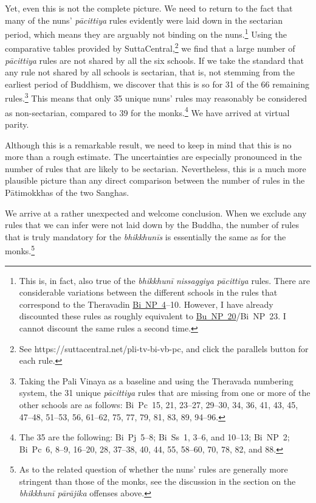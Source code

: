 \documentclass[12pt,openany]{book}%
\begin{document}
Yet, even this is not the complete picture. We need to return to the fact that many of the nuns’ \textit{\textsanskrit{pācittiya}} rules evidently were laid down in the sectarian period, which means they are arguably not binding on the nuns.\footnote{This is, in fact, also true of the \textit{\textsanskrit{bhikkhunī} nissaggiya \textsanskrit{pācittiya}} rules. There are considerable variations between the different schools in the rules that correspond to the Theravadin \href{https://suttacentral.net/pli-tv-bi-vb-np4/en/brahmali\#1.27.1}{Bi~NP~4}–10. However, I have already discounted these rules as roughly equivalent to \href{https://suttacentral.net/pli-tv-bu-vb-np20/en/brahmali\#1.35.1}{Bu~NP~20}/Bi NP 23. I cannot discount the same rules a second time. } Using the comparative tables provided by SuttaCentral,\footnote{See https://suttacentral.net/pli-tv-bi-vb-pc, and click the parallels button for each rule. } we find that a large number of \textit{\textsanskrit{pācittiya}} rules are not shared by all the six schools. If we take the standard that any rule not shared by all schools is sectarian, that is, not stemming from the earliest period of Buddhism, we discover that this is so for 31 of the 66 remaining rules.\footnote{Taking the Pali Vinaya as a baseline and using the Theravada numbering system, the 31 unique \textit{\textsanskrit{pācittiya}} rules that are missing from one or more of the other schools are as follows: Bi Pc 15, 21, 23–27, 29–30, 34, 36, 41, 43, 45, 47–48, 51–53, 56, 61–62, 75, 77, 79, 81, 83, 89, 94–96. } This means that only 35 unique nuns’ rules may reasonably be considered as non-sectarian, compared to 39 for the monks.\footnote{The 35 are the following: Bi Pj 5–8; Bi Ss 1, 3–6, and 10–13; Bi NP 2; Bi Pc 6, 8–9, 16–20, 28, 37–38, 40, 44, 55, 58–60, 70, 78, 82, and 88. } We have arrived at virtual parity.

Although this is a remarkable result, we need to keep in mind that this is no more than a rough estimate. The uncertainties are especially pronounced in the number of rules that are likely to be sectarian. Nevertheless, this is a much more plausible picture than any direct comparison between the number of rules in the \textsanskrit{Pātimokkhas} of the two Sanghas.

We arrive at a rather unexpected and welcome conclusion. When we exclude any rules that we can infer were not laid down by the Buddha, the number of rules that is truly mandatory for the \textit{\textsanskrit{bhikkhunīs}} is essentially the same as for the monks.\footnote{As to the related question of whether the nuns’ rules are generally more stringent than those of the monks, see the discussion in the section on the \textit{\textsanskrit{bhikkhunī} \textsanskrit{pārājika}} offenses above. }
\end{document}

